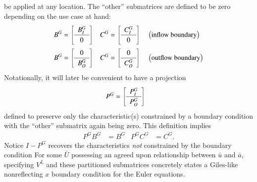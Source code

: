 \documentclass[letterpaper,11pt,nointlimits,reqno,draft]{amsart}
\begin{document}
be applied at any location.  The ``other'' submatrices are defined to be zero
depending on the use case at hand:
\begin{align}
  B^G &=
\renewcommand*{\arraystretch}{1.2}
  \left[\begin{array}{c} B^G_{I} \\ \hline 0       \end{array}\right]
  &
  C^G &=
\renewcommand*{\arraystretch}{1.2}
  \left[\begin{array}{c} C^G_{I} \\ \hline 0       \end{array}\right]
  &
  &\left(\text{inflow boundary}\right)
\\
  B^G &=
\renewcommand*{\arraystretch}{1.2}
  \left[\begin{array}{c} 0       \\ \hline B^G_{O} \end{array}\right]
  &
  C^G &=
\renewcommand*{\arraystretch}{1.2}
  \left[\begin{array}{c} 0       \\ \hline C^G_{O} \end{array}\right]
  &
  &\left(\text{outflow boundary}\right)
\end{align}
Notationally, it will later be convenient to have a projection
\begin{align}
\label{eq:PG}
\renewcommand*{\arraystretch}{1.2}
  P^G
  &=
  \left[\begin{array}{c} P^G_{I} \\ \hline P^G_{O} \end{array}\right]
\end{align}
defined to preserve only the characteristic(s) constrained by a boundary
condition with the ``other'' submatrix again being zero.  This definition
implies
\begin{align}
\label{eq:PGidempotence}
  P^G B^G &= B^G
  &
  P^G C^G &= C^G
.
\end{align}
Notice $I - P^G$ recovers the characteristics \emph{not} constrained by the
boundary condition For some $\bar{U}$ possessing an agreed upon relationship
between $\bar{u}$ and $\bar{a}$, specifying $V^L$ and these partitioned
submatrices concretely states a Giles-like nonreflecting $x$ boundary condition
for the Euler equations.
\end{document}
